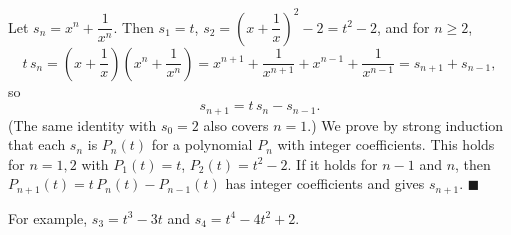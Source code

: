 Let $s_n=x^n+\dfrac{1}{x^n}$. Then $s_1=t$, $s_2=\left(x+\dfrac{1}{x}\right)^2-2=t^2-2$, and for $n\ge2$,
\[
t\,s_n=\left(x+\dfrac{1}{x}\right)\left(x^n+\dfrac{1}{x^n}\right)=x^{n+1}+\dfrac{1}{x^{n+1}}+x^{n-1}+\dfrac{1}{x^{n-1}}=s_{n+1}+s_{n-1},
\]
so
\[
s_{n+1}=t\,s_n-s_{n-1}.
\]
(The same identity with $s_0=2$ also covers $n=1$.) We prove by strong induction that each $s_n$ is $P_n(t)$ for a polynomial $P_n$ with integer coefficients. This holds for $n=1,2$ with $P_1(t)=t$, $P_2(t)=t^2-2$. If it holds for $n-1$ and $n$, then $P_{n+1}(t)=t\,P_n(t)-P_{n-1}(t)$ has integer coefficients and gives $s_{n+1}$. $\blacksquare$

For example, $s_3=t^3-3t$ and $s_4=t^4-4t^2+2$.
